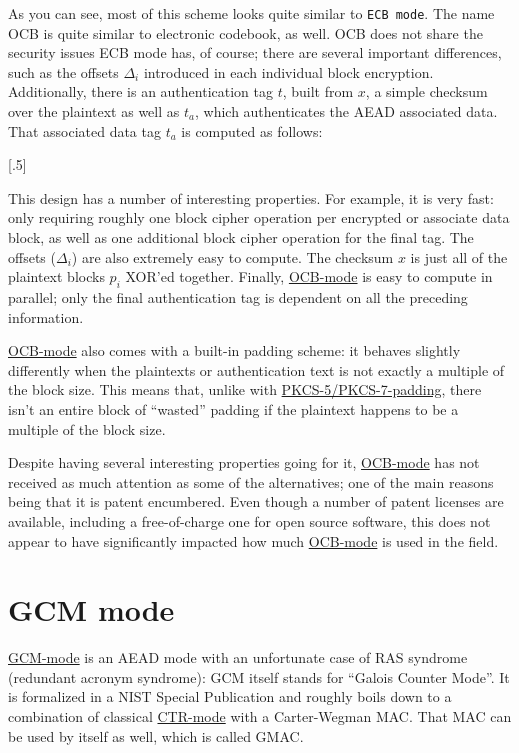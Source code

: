 \documentclass[11pt,ebook,table,dvipsnames]{memoir}
\begin{document}
As you can see, most of this scheme looks quite similar to \texttt{ECB mode}.
The name \gls{OCB} is quite similar to electronic codebook, as well.
OCB does not share the security issues ECB mode has, of course; there
are several important differences, such as the offsets $\Delta_i$
introduced in each individual block encryption. Additionally, there is
an authentication tag $t$, built from $x$, a simple checksum over the
plaintext as well as $t_a$, which authenticates the \gls{AEAD}
associated data. That associated data tag $t_a$ is computed as
follows:

[.5]

This design has a number of interesting properties. For example, it is
very fast: only requiring roughly one block cipher operation per
encrypted or associate data block, as well as one additional block
cipher operation for the final tag. The offsets ($\Delta_i$) are also
extremely easy to compute. The checksum $x$ is just all of the
plaintext blocks $p_i$ XOR'ed together. Finally, \hyperref[OCB mode]{OCB-mode} is easy to
compute in parallel; only the final authentication tag is dependent on
all the preceding information.

\hyperref[OCB mode]{OCB-mode} also comes with a built-in padding scheme: it behaves
slightly differently when the plaintexts or authentication text is not
exactly a multiple of the block size. This means that, unlike with
\hyperref[PKCS\#5/PKCS\#7 padding]{PKCS-5/PKCS-7-padding}, there isn't an entire block of \enquote{wasted} padding
if the plaintext happens to be a multiple of the block size.

Despite having several interesting properties going for it, \hyperref[OCB mode]{OCB-mode}
has not received as much attention as some of the alternatives; one of
the main reasons being that it is patent encumbered. Even though a
number of patent licenses are available\cite{ocb:license}, including a
free-of-charge one for open source software, this does not appear to
have significantly impacted how much \hyperref[OCB mode]{OCB-mode} is used in the field.
\section{\label{GCM-mode}GCM mode}
\label{sec-2-7-9}

\hyperref[GCM mode]{GCM-mode} is an \gls{AEAD mode} with an unfortunate case of RAS
syndrome (redundant acronym syndrome): GCM itself stands for \enquote{Galois
Counter Mode}. It is formalized in a NIST Special
Publication\cite{gcm} and roughly boils down to a combination of
classical \hyperref[CTR mode]{CTR-mode} with a \gls{Carter-Wegman MAC}. That MAC can be
used by itself as well, which is called \gls{GMAC}.
\end{document}
